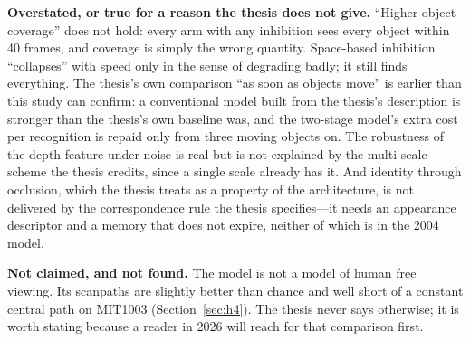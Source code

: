 \documentclass[11pt,a4paper]{article}
\begin{document}
\textbf{Overstated, or true for a reason the thesis does not give.} ``Higher
object coverage'' does not hold: every arm with any inhibition sees every object
within 40 frames, and coverage is simply the wrong quantity. Space-based
inhibition ``collapses'' with speed only in the sense of degrading badly; it
still finds everything. The thesis's own comparison ``as soon as objects move''
is earlier than this study can confirm: a conventional model built from the
thesis's description is stronger than the thesis's own baseline was, and the
two-stage model's extra cost per recognition is repaid only from three moving
objects on. The robustness of the depth feature under noise is real but is not
explained by the multi-scale scheme the thesis credits, since a single scale
already has it. And identity through occlusion, which the thesis treats as a
property of the architecture, is not delivered by the correspondence rule the
thesis specifies---it needs an appearance descriptor and a memory that does not
expire, neither of which is in the 2004 model.

\textbf{Not claimed, and not found.} The model is not a model of human free
viewing. Its scanpaths are slightly better than chance and well short of a
constant central path on MIT1003 (Section~\ref{sec:h4}). The thesis never says
otherwise; it is worth stating because a reader in 2026 will reach for that
comparison first.
\end{document}
